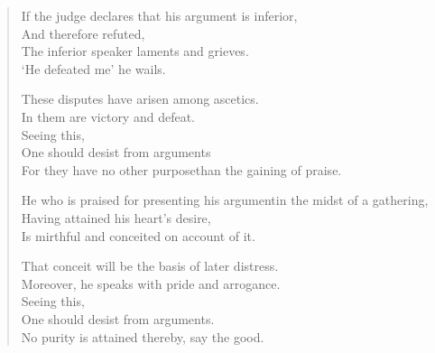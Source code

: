 \begin{verse}
 If the judge declares that his argument is inferior,\\
And therefore refuted,\\
The inferior speaker laments and grieves.\\
`He defeated me' he wails.


 These disputes have arisen among ascetics.\\
In them are victory and defeat.\\
Seeing this,\\
One should desist from arguments\\
For they have no other purpose\newline than the gaining of praise.


 He who is praised for presenting his argument\newline in the midst of a gathering,\\
Having attained his heart’s desire,\\
Is mirthful and conceited on account of it.


 That conceit will be the basis of later distress.\\
Moreover, he speaks with pride and arrogance.\\
Seeing this,\\
One should desist from arguments.\\
No purity is attained thereby, say the good.



\end{verse}
